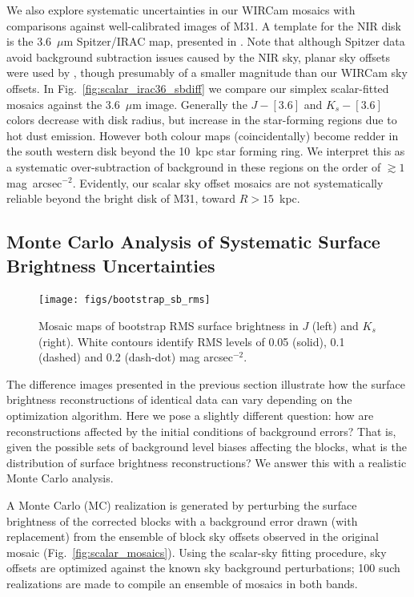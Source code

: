 \documentclass[iop]{emulateapj}
\newcommand{\Fig}[1]{Fig.~\ref{fig:#1}}  %
\begin{document}
We also explore systematic uncertainties in our WIRCam mosaics with comparisons against well-calibrated images of M31.
A template for the NIR disk is the 3.6~$\mu$m Spitzer/IRAC map, presented in \cite{Barmby:2006}.
Note that although Spitzer data avoid background subtraction issues caused by the NIR sky, planar sky offsets were used by \citeauthor{Barmby:2006}, though presumably of a smaller magnitude than our WIRCam sky offsets.
In \Fig{scalar_irac36_sbdiff} we compare our simplex scalar-fitted mosaics against the 3.6~$\mu$m image.
Generally the $J-[3.6]$ and $K_s-[3.6]$ colors decrease with disk radius, but increase in the star-forming regions due to hot dust emission.
However both colour maps (coincidentally) become redder in the south western disk beyond the 10~kpc star forming ring.
We interpret this as a systematic over-subtraction of background in these regions on the order of $\gtrsim 1$ mag~arcsec$^{-2}$.
Evidently, our scalar sky offset mosaics are not systematically reliable beyond the bright disk of M31, toward $R>15$~kpc.

\subsection{Monte Carlo Analysis of Systematic Surface Brightness Uncertainties}
\label{sec:montecarlo}

\begin{figure}[t]
\centering
\texttt{[image: figs/bootstrap\_sb\_rms]}
\caption{Mosaic maps of bootstrap RMS surface brightness in $J$ (left) and $K_s$ (right).
White contours identify RMS levels of 0.05 (solid), 0.1 (dashed) and 0.2 (dash-dot) mag arcsec$^{-2}$.}
\label{fig:bootstrap_sb_rms}
\end{figure}

The difference images presented in the previous section illustrate how the surface brightness reconstructions of identical data can vary depending on the optimization algorithm.
Here we pose a slightly different question: how are reconstructions affected by the initial conditions of background errors?
That is, given the possible sets of background level biases affecting the blocks, what is the distribution of surface brightness reconstructions?
We answer this with a realistic Monte Carlo analysis.

A Monte Carlo (MC) realization is generated by perturbing the surface brightness of the corrected blocks with a background error drawn (with replacement) from the ensemble of block sky offsets observed in the original mosaic (\Fig{scalar_mosaics}).
Using the scalar-sky fitting procedure, sky offsets  are optimized against the known sky background perturbations; 100 such realizations are made to compile an ensemble of mosaics in both bands.
\end{document}
